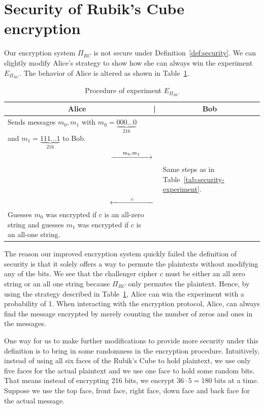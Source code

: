 \section{Security of Rubik's Cube encryption}
Our encryption system $\Pi_{RC}$ is not secure under Definition~\ref{def:security}. We can slightly modify Alice's strategy to show how she can always win the experiment $E_{\Pi_{RC}}$. The behavior of Alice is altered as shown in Table~\ref{tab:cube-security-experiment}.
\begin{table}[ht]
    \centering
    \begin{tabular}{|p{6.5cm}p{0.5cm}p{6.5cm}|}
        \hline \multicolumn{1}{|c}{Alice} & \multicolumn{1}{c}{|} & \multicolumn{1}{c|}{Bob} \\ \hline
        \hline Sends messages $m_0, m_1$ with $m_0 = \underbrace{000...0}_{216}$ and $m_1 = \underbrace{111...1}_{216}$ to Bob. & & \\
        \multicolumn{3}{|c|}{$\xrightarrow{\hspace{0.5cm} m_0, m_1 \hspace{0.5cm}}$} \\
        & & Same steps as in Table~\ref{tab:security-experiment}. \\
        \multicolumn{3}{|c|}{$\xleftarrow{\hspace{0.9cm} c \hspace{0.9cm}}$} \\
        Guesses $m_0$ was encrypted if $c$ is an all-zero string and guesses $m_1$ was encrypted if $c$ is an all-one string. & & \\
        \hline
    \end{tabular}
    \caption{Procedure of experiment $E_{\Pi_{RC}}$}
    \label{tab:cube-security-experiment}
\end{table}
The reason our improved encryption system quickly failed the definition of security is that it solely offers a way to permute the plaintexts without modifying any of the bits. We see that the challenger cipher $c$ must be either an all zero string or an all one string because $\Pi_{RC}$ only permutes the plaintext. Hence, by using the strategy described in Table~\ref{tab:cube-security-experiment}, Alice can win the experiment with a probability of 1. When interacting with the encryption protocol, Alice, can always find the message encrypted by merely counting the number of zeros and ones in the messages. 
\par One way for us to make further modifications to provide more security under this definition is to bring in some randomness in the encryption procedure. Intuitively, instead of using all six faces of the Rubik's Cube to hold plaintext, we use only five faces for the actual plaintext and we use one face to hold some random bits. That means instead of encrypting 216 bits, we encrypt $36 \cdot 5 = 180$ bits at a time. Suppose we use the top face, front face, right face, down face and back face for the actual message.
